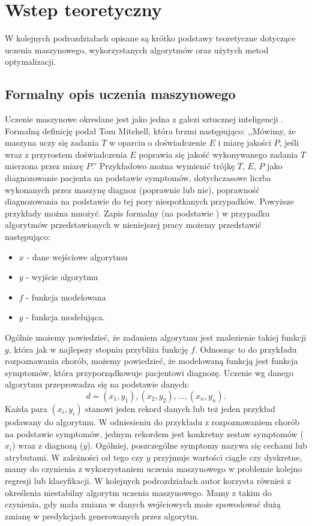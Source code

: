 \section{Wstep teoretyczny} \label{theory}
W kolejnych podrozdziałach opisane są krótko podstawy teoretyczne dotyczące uczenia maszynowego, wykorzystanych algorytmów oraz użytych metod optymalizacji.
\subsection{Formalny opis uczenia maszynowego}
Uczenie maszynowe okreslane jest jako jedna z galezi sztucznej inteligencji \cite{dnn1}. Formalną definicję podał Tom Mitchell, która brzmi następująco: ,,Mówimy, że maszyna uczy się zadania $T$ w oparciu o doświadczenie $E$ i miarę jakości $P$, jeśli wraz z przyrostem doświadczenia $E$ poprawia się jakość wykonywanego zadania $T$ mierzona przez miarę $P$.''\cite{mitchel} Przykładowo można wymienić trójkę $T$, $E$, $P$ jako diagnozowanie pacjenta na podstawie symptomów, dotychczasowe  liczba wykonanych przez maszynę diagnoz (poprawnie lub nie),  poprawność diagnozowania na podstawie do tej pory niespotkanych przypadków. Powyższe przykłady można mnożyć. Zapis formalny (na podstawie \cite{formal2}) w przypadku algorytmów przedstawionych w nieniejszej pracy możemy przedstawić następująco:
\begin{itemize}
\item $x$ - dane wejściowe algorytmu
\item $y$ - wyjście algorytmu
\item $f$ - funkcja modelowana
\item $g$ - funkcja modelująca.
\end{itemize}
Ogólnie możemy powiedzieć, że zadaniem algorytmu jest znalezienie takiej funkcji $g$, która jak w najlepszy stopniu przybliża funkcję $f$. Odnosząc to do przykładu rozpoznawania chorób, możemy powiedzieć, że modelowaną funkcją jest funkcja symptomów, która przyporządkowuje pacjentowi diagnozę. Uczenie wg danego algorytmu przeprowadza się na podstawie danych:
\begin{equation}
d = (x_1,y_1), (x_2, y_2), ..., (x_n, y_n).
\end{equation}
Każda para $(x_i, y_i)$ stanowi jeden rekord danych lub też jeden przykład podawany do algorytmu. W odniesieniu do przykładu z rozpoznawaniem chorób na podstawie symptomów, jednym rekordem jest konkretny zestaw symptomów ($x_i$) wraz z diagnozą ($y$).  Ogólniej, poszczególne symptomy nazywa się cechami lub atrybutami. W zależności od tego czy $y$ przyjmuje wartości ciągłe czy dyskretne, mamy do czynienia z wykorzystaniem uczenia maszynowego w problemie kolejno regresji lub klasyfikacji. W kolejnych podrozdziałach autor korzysta również z określenia niestabilny algorytm uczenia maszynowego. Mamy z takim do czynienia, gdy mała zmiana w danych wejściowych może spowodować dużą zmianę w predykcjach generowanych przez algorytm\cite{ensamble}.

